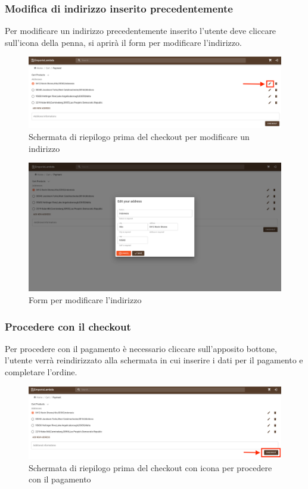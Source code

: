 \subsubsection{Modifica di indirizzo inserito precedentemente}
Per modificare un indirizzo precedentemente inserito l'utente deve cliccare sull'icona della penna, si aprirà il form per modificare l'indirizzo.
\begin{figure}[H]
	\centering
	\includegraphics[scale=0.25]{Immagini/Acquirente/payment.addressmodify.png}
	\caption{Schermata di riepilogo prima del checkout per modificare un indirizzo}
	\label{fig:EditAddress}
\end{figure}
\begin{figure}[H]
	\centering
	\includegraphics[scale=0.25]{Immagini/Acquirente/payment-edit-address.customer.png}
	\caption{Form per modificare l'indirizzo}
	\label{fig:CartEditAddress}
\end{figure}
\subsubsection{Procedere con il checkout}
Per procedere con il pagamento è necessario cliccare sull'apposito bottone, l'utente verrà reindirizzato alla schermata in cui inserire i dati per il pagamento e completare l'ordine.
\begin{figure}[H]
	\centering
	\includegraphics[scale=0.25]{Immagini/Acquirente/payment.checkout.png}
	\caption{Schermata di riepilogo prima del checkout con icona per procedere con il pagamento}
	\label{fig:CartCheckout}
\end{figure}